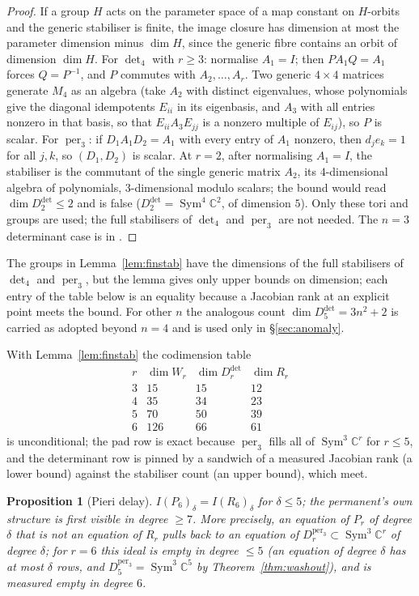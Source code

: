 \documentclass[11pt]{amsart}
\theoremstyle{plain}
\newtheorem{proposition}[theorem]{Proposition}
\theoremstyle{definition}
\theoremstyle{remark}
\DeclareMathOperator{\Sym}{Sym}
\DeclareMathOperator{\per}{per}
\newcommand{\bC}{\mathbb{C}}
\newcommand{\Rr}{R}
\newcommand{\Pp}{P}
\newcommand{\Ddet}{D^{\det}}
\begin{document}
\begin{proof}
If a group $H$ acts on the parameter space of a map constant on $H$-orbits and
the generic stabiliser is finite, the image closure has dimension at most the
parameter dimension minus $\dim H$, since the generic fibre contains an orbit
of dimension $\dim H$.  For $\det_4$ with $r\ge3$: normalise $A_1=I$; then
$PA_1Q=A_1$ forces $Q=P^{-1}$, and $P$ commutes with $A_2,\dots,A_r$.  Two
generic $4\times4$ matrices generate $M_4$ as an algebra (take $A_2$ with
distinct eigenvalues, whose polynomials give the diagonal idempotents $E_{ii}$
in its eigenbasis, and $A_3$ with all entries nonzero in that basis, so that
$E_{ii}A_3E_{jj}$ is a nonzero multiple of $E_{ij}$), so $P$ is scalar.  For
$\per_3$: if $D_1A_1D_2=A_1$ with every entry of $A_1$ nonzero, then
$d_je_k=1$ for all $j,k$, so $(D_1,D_2)$ is scalar.  At $r=2$, after
normalising $A_1=I$, the stabiliser is the commutant of the single generic
matrix $A_2$, its $4$-dimensional algebra of polynomials, $3$-dimensional
modulo scalars; the bound would read $\dim\Ddet_2\le2$ and is false
($\Ddet_2=\Sym^{4}\bC^{2}$, of dimension $5$).  Only these tori and groups are
used; the full stabilisers of $\det_4$ and $\per_3$ are not needed.  The
$n=3$ determinant case is in \cite[\S4]{Companion}.
\end{proof}

The groups in Lemma~\ref{lem:finstab} have the dimensions of the full
stabilisers of $\det_4$ and $\per_3$, but the lemma gives only upper bounds on
dimension; each entry of the table below is an equality because a Jacobian rank
at an explicit point meets the bound.  For other $n$ the analogous count
$\dim\Ddet_5=3n^{2}+2$ is carried as adopted beyond $n=4$ and is used only in
\S\ref{sec:anomaly}.

With Lemma~\ref{lem:finstab} the codimension table
\[
\begin{array}{c|ccc}
 r & \dim W_r & \dim\Ddet_r & \dim\Rr_r\\\hline
 3 & 15 & 15 & 12\\
 4 & 35 & 34 & 23\\
 5 & 70 & 50 & 39\\
 6 & 126& 66 & 61
\end{array}
\]
is unconditional; the pad row is exact because $\per_3$ fills all of
$\Sym^{3}\bC^{r}$ for $r\le5$, and the determinant row is pinned by a sandwich
of a measured Jacobian rank (a lower bound) against the stabiliser count (an
upper bound), which meet.

\begin{proposition}[Pieri delay]\label{prop:pieri}
$I(\Pp_6)_\delta=I(\Rr_6)_\delta$ for $\delta\le5$; the permanent's own
structure is first visible in degree $\ge7$.  More precisely, an equation of
$\Pp_r$ of degree $\delta$ that is not an equation of $\Rr_r$ pulls back to an
equation of $D^{\per_3}_r\subset\Sym^{3}\bC^{r}$ of degree
$\delta$; for $r=6$ this ideal is empty in degree $\le5$ (an equation of degree
$\delta$ has at most $\delta$ rows, and $D^{\per_3}_5=\Sym^{3}\bC^{5}$
by Theorem~\ref{thm:washout}), and is measured empty in degree $6$.
\end{proposition}
\end{document}
